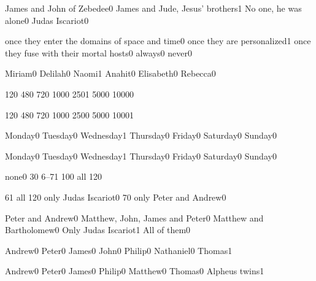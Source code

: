 {James and John of Zebedee}{0}
{James and Jude, Jesus' brothers}{1}
{No one, he was alone}{0}
{Judas Iscariot}{0}
\qstop

{once they enter the domains of space and time}{0}
{once they are personalized}{1}
{once they fuse with their mortal hosts}{0}
{always}{0}
{never}{0}
\qstop


{Miriam}{0}
{Delilah}{0}
{Naomi}{1}
{Anahit}{0}
{Elisabeth}{0}
{Rebecca}{0}
\qstop

{12}{0}
{48}{0}
{72}{0}
{100}{0}
{250}{1}
{500}{0}
{1000}{0}
\qstop

{12}{0}
{48}{0}
{72}{0}
{100}{0}
{250}{0}
{500}{0}
{1000}{1}
\qstop

{Monday}{0}
{Tuesday}{0}
{Wednesday}{1}
{Thursday}{0}
{Friday}{0}
{Saturday}{0}
{Sunday}{0}
\qstop

{Monday}{0}
{Tuesday}{0}
{Wednesday}{1}
{Thursday}{0}
{Friday}{0}
{Saturday}{0}
{Sunday}{0}
\qstop


{none}{0}
{3}{0}
{6--7}{1}
{10}{0}
{all 12}{0}
\qstop


{6}{1}
{all 12}{0}
{only Judas Iscariot}{0}
{7}{0}
{only Peter and Andrew}{0}
\qstop

{Peter and Andrew}{0}
{Matthew, John, James and Peter}{0}
{Matthew and Bartholomew}{0}
{Only Judas Iscariot}{1}
{All of them}{0}
\qstop

{Andrew}{0}
{Peter}{0}
{James}{0}
{John}{0}
{Philip}{0}
{Nathaniel}{0}
{Thomas}{1}
\qstop

{Andrew}{0}
{Peter}{0}
{James}{0}
{Philip}{0}
{Matthew}{0}
{Thomas}{0}
{Alpheus twins}{1}
\qstop

